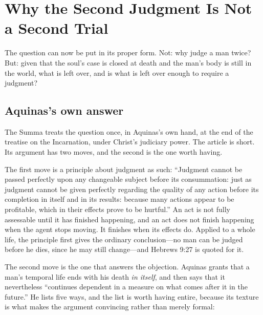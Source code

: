 \section{Why the Second Judgment Is Not a Second Trial}\label{sec:trial}

The question can now be put in its proper form. Not: why judge a man twice? But: given that the soul's case is closed at death and the man's body is still in the world, what is left over, and is what is left over enough to require a judgment?

\subsection{Aquinas's own answer}

The Summa treats the question once, in Aquinas's own hand, at the end of the treatise on the Incarnation, under Christ's judiciary power. The article is short. Its argument has two moves, and the second is the one worth having.

The first move is a principle about judgment as such: ``Judgment cannot be passed perfectly upon any changeable subject before its consummation: just as judgment cannot be given perfectly regarding the quality of any action before its completion in itself and in its results: because many actions appear to be profitable, which in their effects prove to be hurtful.'' An act is not fully assessable until it has finished happening, and an act does not finish happening when the agent stops moving. It finishes when its effects do. Applied to a whole life, the principle first gives the ordinary conclusion---no man can be judged before he dies, since he may still change---and Hebrews 9:27 is quoted for it.

The second move is the one that answers the objection. Aquinas grants that a man's temporal life ends with his death \emph{in itself}, and then says that it nevertheless ``continues dependent in a measure on what comes after it in the future.'' He lists five ways, and the list is worth having entire, because its texture is what makes the argument convincing rather than merely formal:

